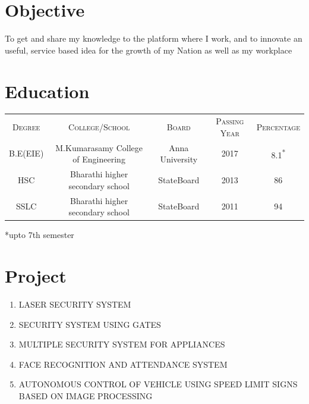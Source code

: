 \documentclass[a4paper,12pt,line]{article}
\begin{document}
	\section*{\color{magenta}Objective}
	
		\hspace{10mm}To get and share my knowledge to the platform where I work, and to innovate an useful, service based idea for the growth of my Nation as well as my workplace
		
		
	
	\section*{\color{magenta}Education}
	\begin{tabular}{ccccc}
		\rowcolor{yellow!20}
		\color{blue}\textsc{Degree}&\color{blue}\textsc{College/School}&\color{blue}\textsc{Board}&\color{blue}\textsc{Passing Year} &\color{blue}\textsc{Percentage}\\%
		\rowcolor{orange!30}
		B.E(EIE)&M.Kumarasamy College of Engineering&Anna University&2017&8.1\textsuperscript{*}\\\rowcolor{orange!30}
		HSC&Bharathi higher secondary school&StateBoard&2013&86\\\rowcolor{orange!30}
		SSLC&Bharathi higher secondary school&StateBoard&2011&94\\
		
	\end{tabular}
	\begin{flushright}
		*upto 7th semester
	\end{flushright}

	\section*{{\color{magenta}Project}}
	\begin{enumerate}
		\item LASER SECURITY SYSTEM
		\item SECURITY SYSTEM USING GATES
		\item MULTIPLE SECURITY SYSTEM FOR APPLIANCES
		\item FACE RECOGNITION AND ATTENDANCE SYSTEM
		\item AUTONOMOUS CONTROL OF VEHICLE USING SPEED LIMIT SIGNS\\BASED ON IMAGE PROCESSING
	\end{enumerate}
	\vspace*{3.2cm}
	
\end{document}
